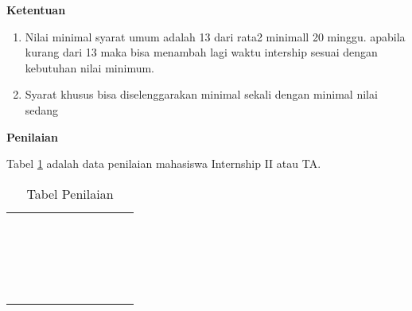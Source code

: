 \textbf {Ketentuan}
\begin{enumerate}
  \item Nilai minimal syarat umum adalah 13 dari rata2 minimall 20 minggu. apabila kurang dari 13 maka bisa menambah lagi waktu intership sesuai dengan kebutuhan nilai minimum.
  \item Syarat khusus bisa diselenggarakan minimal sekali dengan minimal nilai sedang
\end{enumerate}
\textbf{Penilaian}
\par Tabel \ref{table:Penilaian} adalah data penilaian mahasiswa Internship II atau TA.
\begin{table}[!htbp]
\centering
\begin{tabular}{ |c|c|c|c|c|c|c|c|c|c| }
\hline
 &  &  &  &  \\
\hline
 &  &  &  &  \\
\hline
 &  &  &  &  \\
\hline
 &  &  &  &  \\
\hline
 &  &  &  &  \\
\hline
 &  &  &  &  \\
\hline
 &  &  &  &  \\
\hline
 &  &  &  &  \\
\hline
 &  &  &  &  \\
\hline
 &  &  &  &  \\
\hline
 &  &  &  &  \\
\hline
 &  &  &  &  \\
\hline
 &  &  &  &  \\
\hline
 &  &  &  &  \\
\hline
 &  &  &  &  \\
\hline
 &  &  &  &  \\
\hline
 &  &  &  &  \\
\hline
 &  &  &  &  \\
\hline
 &  &  &  &  \\
\hline
 &  &  &  &  \\
\hline
\end{tabular}
\caption{Tabel Penilaian}
\label{table:Penilaian}
\end{table}
